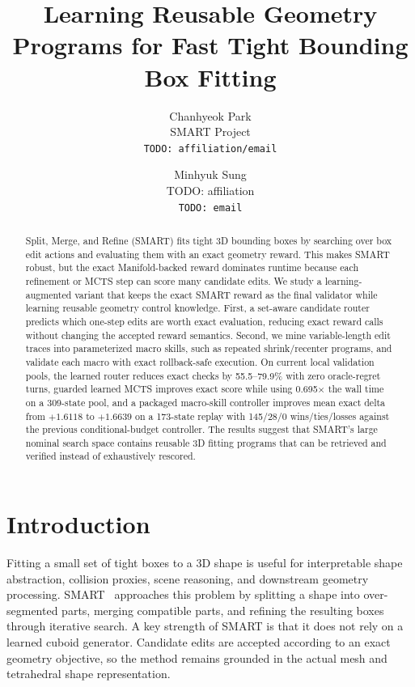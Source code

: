 \documentclass[10pt,twocolumn,letterpaper]{article}
\title{Learning Reusable Geometry Programs for Fast Tight Bounding Box Fitting}
\author{%
Chanhyeok Park\\
SMART Project\\
{\tt\small TODO: affiliation/email}
\and
Minhyuk Sung\\
TODO: affiliation\\
{\tt\small TODO: email}
}
\begin{document}
\maketitle

\begin{abstract}
Split, Merge, and Refine (SMART) fits tight 3D bounding boxes by searching over
box edit actions and evaluating them with an exact geometry reward.  This makes
SMART robust, but the exact Manifold-backed reward dominates runtime because
each refinement or MCTS step can score many candidate edits.  We study a
learning-augmented variant that keeps the exact SMART reward as the final
validator while learning reusable geometry control knowledge.  First, a
set-aware candidate router predicts which one-step edits are worth exact
evaluation, reducing exact reward calls without changing the accepted reward
semantics.  Second, we mine variable-length edit traces into parameterized
macro skills, such as repeated shrink/recenter programs, and validate each
macro with exact rollback-safe execution.  On current local validation pools,
the learned router reduces exact checks by 55.5--79.9\% with zero oracle-regret
turns, guarded learned MCTS improves exact score while using 0.695$\times$ the
wall time on a 309-state pool, and a packaged macro-skill controller improves
mean exact delta from $+1.6118$ to $+1.6639$ on a 173-state replay with
145/28/0 wins/ties/losses against the previous conditional-budget controller.
The results suggest that SMART's large nominal search space contains reusable
3D fitting programs that can be retrieved and verified instead of exhaustively
rescored.
\end{abstract}

\section{Introduction}

Fitting a small set of tight boxes to a 3D shape is useful for interpretable
shape abstraction, collision proxies, scene reasoning, and downstream geometry
processing.  SMART~\cite{park2024smart} approaches this problem by splitting a
shape into over-segmented parts, merging compatible parts, and refining the
resulting boxes through iterative search.  A key strength of SMART is that it
does not rely on a learned cuboid generator.  Candidate edits are accepted
according to an exact geometry objective, so the method remains grounded in the
actual mesh and tetrahedral shape representation.
\end{document}
